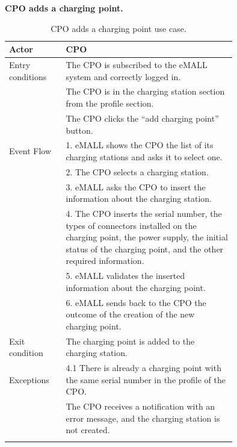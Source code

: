 \textbf{CPO adds a charging point.}
\begin{center}
    \begin{longtable}{lp{0.75\linewidth}}
        \hline
        Actor            & CPO                                                                                             \\
        \hline
        Entry conditions & The CPO is subscribed to the eMALL system and correctly logged in.                              \\
        & The CPO is in the charging station section from the profile section.                            \\
        & The CPO clicks the “add charging point” button.                                                 \\
        \hline
        Event Flow       & 1. eMALL shows the CPO the list of its charging stations and asks it to select one.             \\
        & 2. The CPO selects a charging station.                                                          \\
        & 3. eMALL asks the CPO to insert the information about the charging station.                     \\
        & 4. The CPO inserts the serial number, the types of connectors installed on the charging point, the power supply,
        the initial status of the charging point, and the other required information. \\
        & 5. eMALL validates the inserted information about the charging point.                           \\
        & 6. eMALL sends back to the CPO the outcome of the creation of the new charging point.           \\
        \hline
        Exit condition   & The charging point is added to the charging station.                                            \\
        \hline
        Exceptions       & 4.1 There is already a charging point with the same serial number in the profile of the CPO.    \\
        & The CPO receives a notification with an error message, and the charging station is not created. \\
        \hline
        \caption{CPO adds a charging point use case.}
        \label{tab: CPO_adds_charging_point_use_case}
    \end{longtable}
\end{center}

